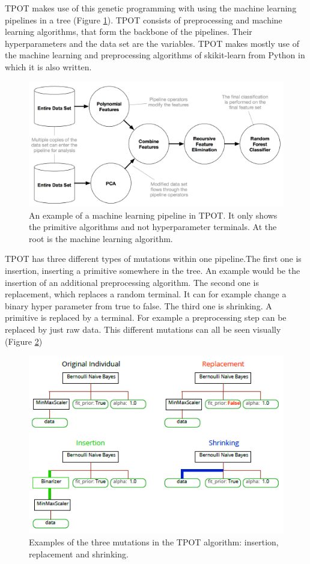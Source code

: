 \documentclass[10pt,a4paper]{article}
\begin{document}
	TPOT makes use of this genetic programming with using the machine learning pipelines in a tree (Figure \ref{fig:MachineLearningPipeline}). TPOT consists of preprocessing and machine learning algorithms, that form the backbone of the pipelines. Their hyperparameters and the data set are the variables. TPOT makes mostly use of the machine learning and preprocessing algorithms of skikit-learn from Python in which it is also written.
	
	\begin{figure}[h!]
		\includegraphics[scale=1]{MachineLearningPipeline.png}
		\caption{An example of a machine learning pipeline in TPOT. It only shows the primitive algorithms and not hyperparameter terminals. At the root is the machine learning algorithm.\cite{Gijsbers2017Thesis}}
		\label{fig:MachineLearningPipeline}
	\end{figure}

	TPOT has three different types of mutations within one pipeline.The first one is insertion, inserting a primitive somewhere in the tree. An example would be the insertion of an additional preprocessing algorithm. The second one is replacement, which replaces a random terminal. It can for example change a binary hyper parameter from true to false. The third one is shrinking. A primitive is replaced by a terminal. For example a preprocessing step can be replaced by just raw data. This different mutations can all be seen visually (Figure \ref{fig:TPOTMutations})
	
	\begin{figure}[h!]
		\includegraphics[scale=1]{TPOTMutations.png}
		\caption{Examples of the three mutations in the TPOT algorithm: insertion, replacement and shrinking.\cite{Gijsbers2017Thesis}}
		\label{fig:TPOTMutations}
	\end{figure}
	
\end{document}
